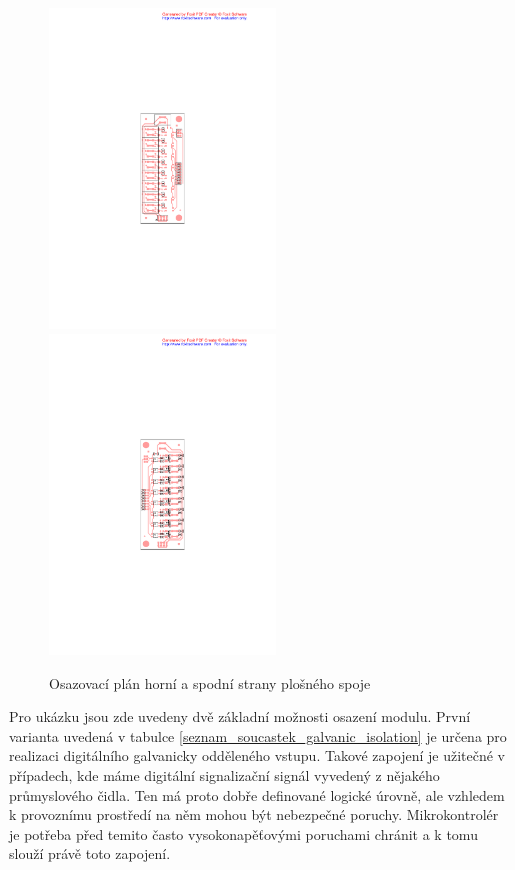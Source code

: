 \documentclass[12pt,a4paper,oneside]{article}
\begin{document}
\begin{figure} [h!tbp]
  \centering
  \includegraphics[trim = 8.0cm 9.5cm 8.0cm 9.5cm, clip, width=6cm]{../../CAM_DOC/O1.pdf}
  \includegraphics[trim = 8.0cm 9.5cm 8.0cm 9.5cm, clip, width=6cm]{../../CAM_DOC/O2.pdf}
  \caption{Osazovací plán horní a spodní strany plošného spoje}
  \label{fig:osazovaci_plan}
\end{figure}

Pro ukázku jsou zde uvedeny dvě základní možnosti osazení modulu. První varianta uvedená v tabulce \ref{seznam_soucastek_galvanic_isolation} je určena pro realizaci digitálního galvanicky odděleného vstupu. Takové zapojení je užitečné v případech, kde máme digitální signalizační signál vyvedený z nějakého průmyslového čidla. Ten má proto dobře definované logické úrovně, ale vzhledem k provoznímu prostředí na něm mohou být nebezpečné poruchy. Mikrokontrolér je potřeba před temito často vysokonapěťovými poruchami chránit a  k tomu slouží právě toto zapojení. 
\end{document}
